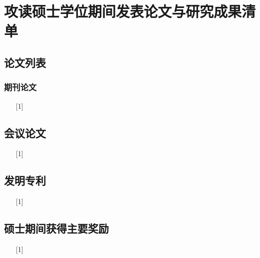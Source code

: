 \chapter*{攻读硕士学位期间发表论文与研究成果清单}

\section*{论文列表}
\subsection*{期刊论文}
\begin{enumerate}

\item[{[1]}] 
\end{enumerate}

\section*{会议论文}
\begin{enumerate}

\item[{[1]}] 
\end{enumerate}

\section*{发明专利}
\begin{enumerate}
	
	\item[{[1]}] 
\end{enumerate}

\section*{硕士期间获得主要奖励}
\begin{enumerate}

\item[{[1]}] 
\end{enumerate}